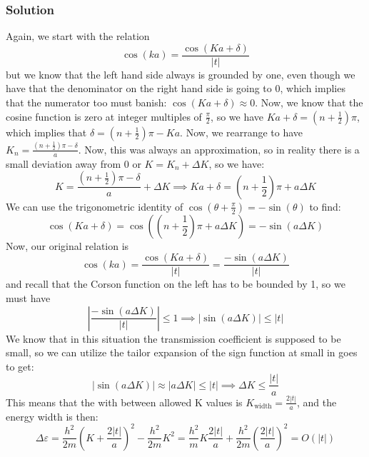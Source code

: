 \documentclass[12pt]{article}
\begin{document}
\subsubsection{Solution}
Again, we start with the relation
\begin{equation}
    \cos(ka) = \frac{\cos(Ka + \delta)}{|t|}
\end{equation}
but we know that the left hand side always is grounded by one, even though we have that the denominator on the right hand side is going to 0, which implies that the numerator too must banish: $\cos(Ka + \delta) \approx 0$. Now, we know that the cosine function is zero at integer multiples of $\frac{\pi}{2}$, so we have $Ka + \delta = \left(n + \frac{1}{2}\right)\pi$, which implies that $\delta = \left(n+\frac{1}{2} \right)\pi - Ka$. Now, we rearrange to have $K_n = \frac{\left(n + \frac{1}{2}\right)\pi - \delta}{a}$. Now, this was always an approximation, so in reality there is a small deviation away from 0 or $K=K_n+\Delta K$, so we have:
\begin{equation}
    K= \frac{\left(n + \frac{1}{2}\right)\pi - \delta}{a} + \Delta K \implies Ka + \delta = \left(n + \frac{1}{2}\right)\pi + a\Delta K
\end{equation}
We can use the trigonometric identity of $\cos(\theta + \frac{\pi}{2}) = -\sin(\theta)$ to find:
\begin{equation}
    \cos(Ka + \delta) = \cos\left(\left(n + \frac{1}{2}\right)\pi + a\Delta K\right) = -\sin(a\Delta K)
\end{equation}
Now, our original relation is
\begin{equation}
    \cos(ka) = \frac{\cos(Ka + \delta)}{|t|} = \frac{-\sin(a\Delta K)}{|t|}
\end{equation}
and recall that the Corson function on the left has to be bounded by 1, so we must have
\begin{equation}
    |\frac{-\sin(a\Delta K)}{|t|}| \leq 1 \implies |\sin(a\Delta K)| \leq |t|
\end{equation}
We know that in this situation the transmission coefficient is supposed to be small, so we can utilize the tailor expansion of the sign function at small in goes to get:
\begin{equation}
    |\sin(a\Delta K)| \approx |a\Delta K| \leq |t| \implies \Delta K \leq \frac{|t|}{a}
\end{equation}
This means that the with between allowed K values is $K_{\text{width}} = \frac{2|t|}{a}$, and the energy width is then:
\begin{equation}
    \Delta \varepsilon = \frac{h^2}{2m}\left(K + \frac{2|t|}{a}\right)^2 - \frac{h^2}{2m}K^2 = \frac{h^2}{m}K\frac{2|t|}{a} + \frac{h^2}{2m}\left(\frac{2|t|}{a}\right)^2 = O(|t|)
\end{equation}
\end{document}
